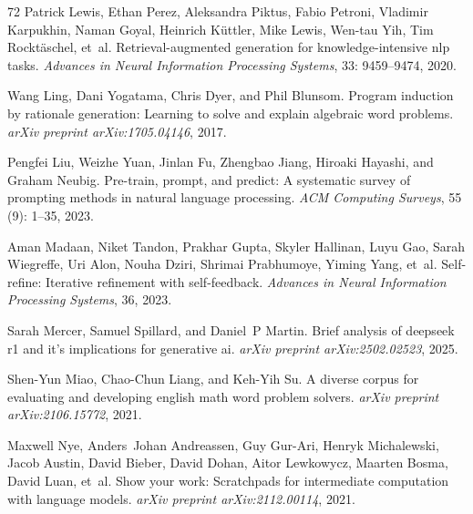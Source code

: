 \begin{thebibliography}{72}
Patrick Lewis, Ethan Perez, Aleksandra Piktus, Fabio Petroni, Vladimir Karpukhin, Naman Goyal, Heinrich K{\"u}ttler, Mike Lewis, Wen-tau Yih, Tim Rockt{\"a}schel, et~al.
\newblock Retrieval-augmented generation for knowledge-intensive nlp tasks.
\newblock \emph{Advances in Neural Information Processing Systems}, 33: 9459--9474, 2020.

Wang Ling, Dani Yogatama, Chris Dyer, and Phil Blunsom.
\newblock Program induction by rationale generation: Learning to solve and explain algebraic word problems.
\newblock \emph{arXiv preprint arXiv:1705.04146}, 2017.

Pengfei Liu, Weizhe Yuan, Jinlan Fu, Zhengbao Jiang, Hiroaki Hayashi, and Graham Neubig.
\newblock Pre-train, prompt, and predict: A systematic survey of prompting methods in natural language processing.
\newblock \emph{ACM Computing Surveys}, 55 (9): 1--35, 2023.

Aman Madaan, Niket Tandon, Prakhar Gupta, Skyler Hallinan, Luyu Gao, Sarah Wiegreffe, Uri Alon, Nouha Dziri, Shrimai Prabhumoye, Yiming Yang, et~al.
\newblock Self-refine: Iterative refinement with self-feedback.
\newblock \emph{Advances in Neural Information Processing Systems}, 36, 2023.

Sarah Mercer, Samuel Spillard, and Daniel~P Martin.
\newblock Brief analysis of deepseek r1 and it's implications for generative ai.
\newblock \emph{arXiv preprint arXiv:2502.02523}, 2025.

Shen-Yun Miao, Chao-Chun Liang, and Keh-Yih Su.
\newblock A diverse corpus for evaluating and developing english math word problem solvers.
\newblock \emph{arXiv preprint arXiv:2106.15772}, 2021.

Maxwell Nye, Anders~Johan Andreassen, Guy Gur-Ari, Henryk Michalewski, Jacob Austin, David Bieber, David Dohan, Aitor Lewkowycz, Maarten Bosma, David Luan, et~al.
\newblock Show your work: Scratchpads for intermediate computation with language models.
\newblock \emph{arXiv preprint arXiv:2112.00114}, 2021.


\end{thebibliography}

